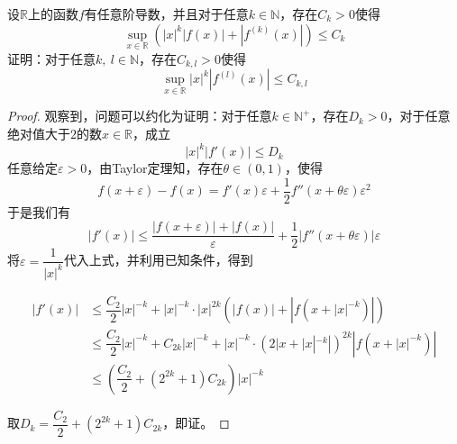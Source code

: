 \begin{proposition}

    设$\mathbb{R}$上的函数$f$有任意阶导数，并且对于任意$k \in \mathbb{N}$，存在$C_k > 0$使得
    $$\sup_{x \in \mathbb{R}}\left( |x|^k|f(x)| + |f^{(k)}(x)| \right) \leq C_k$$
    证明：对于任意$k,\ l \in \mathbb{N}$，存在$C_{k,l} > 0$使得
    $$\sup_{x \in \mathbb{R}}|x|^k|f^{(l)}(x)| \leq C_{k,l}$$

\end{proposition}

\begin{proof}

    观察到，问题可以约化为证明：对于任意$k \in \mathbb{N}^{+}$，存在$D_k > 0$，对于任意绝对值大于$2$的数$x \in \mathbb{R}$，成立
    $$|x|^k|f'(x)| \leq D_k$$
    任意给定$\varepsilon > 0$，由\textup{Taylor}定理知，存在$\theta \in (0,1)$，使得
    $$f(x + \varepsilon) - f(x) = f'(x)\varepsilon + \dfrac{1}{2}f''(x + \theta \varepsilon) \varepsilon^2$$
    于是我们有
    $$|f'(x)| \leq \dfrac{|f(x + \varepsilon)| + |f(x)|}{\varepsilon} + \dfrac{1}{2}|f''(x + \theta \varepsilon)| \varepsilon$$
    将$\varepsilon = \dfrac{1}{|x|^k}$代入上式，并利用已知条件，得到

    \begin{align*}
        |f'(x)| & \leq \dfrac{C_2}{2}|x|^{-k} + |x|^{-k} \cdot |x|^{2k}(|f(x)| + |f(x + |x|^{-k})|) \\
        & \leq \dfrac{C_2}{2}|x|^{-k} + C_{2k}|x|^{-k} + |x|^{-k} \cdot (2|x + |x|^{-k}|)^{2k}|f(x + |x|^{-k})| \\
        & \leq \left( \dfrac{C_2}{2} + (2^{2k} + 1)C_{2k} \right) |x|^{-k}
    \end{align*}

    取$D_k = \dfrac{C_2}{2} + (2^{2k} + 1)C_{2k}$，即证。
    
\end{proof}
